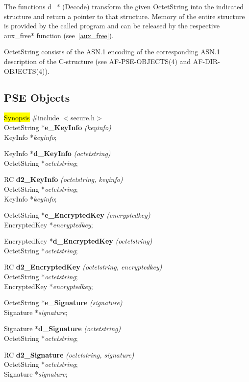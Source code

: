The functions d\_* (Decode) transform the given OctetString into the indicated structure and return
a pointer to that structure. Memory of the entire structure is provided 
by the called program and can be released by the respective aux\_free* function (see~\ref{aux_free}).

OctetString consists of the ASN.1 encoding of the corresponding ASN.1 description of the C-structure
(see AF-PSE-OBJECTS(4) and AF-DIR-OBJECTS(4)).

\subsection{PSE Objects}
\label{Encoding-/Decoding-Secure}
\hl{Synopsis}
\#include $<$secure.h$>$ \\ [0.5cm]
OctetString *{\bf e\_KeyInfo} {\em (keyinfo)} \\
KeyInfo *{\em keyinfo}; 

KeyInfo *{\bf d\_KeyInfo} {\em (octetstring)} \\
OctetString *{\em octetstring}; 

RC {\bf d2\_KeyInfo} {\em (octetstring, keyinfo)} \\
OctetString *{\em octetstring}; \\
KeyInfo *{\em keyinfo}; 

OctetString *{\bf e\_EncryptedKey} {\em (encryptedkey)} \\
EncryptedKey *{\em encryptedkey}; 

EncryptedKey *{\bf d\_EncryptedKey} {\em (octetstring)} \\
OctetString *{\em octetstring}; 

RC {\bf d2\_EncryptedKey} {\em (octetstring, encryptedkey)} \\
OctetString *{\em octetstring}; \\
EncryptedKey *{\em encryptedkey}; 

OctetString *{\bf e\_Signature} {\em (signature)} \\
Signature *{\em signature}; 

Signature *{\bf d\_Signature} {\em (octetstring)} \\
OctetString *{\em octetstring}; 

RC {\bf d2\_Signature} {\em (octetstring, signature)} \\
OctetString *{\em octetstring}; \\
Signature *{\em signature}; 

